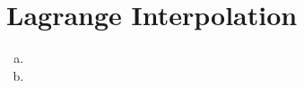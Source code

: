 \section{Lagrange Interpolation}\label{sec:p2}

\begin{enumerate}[(a)]
\item 

\item

\end{enumerate}